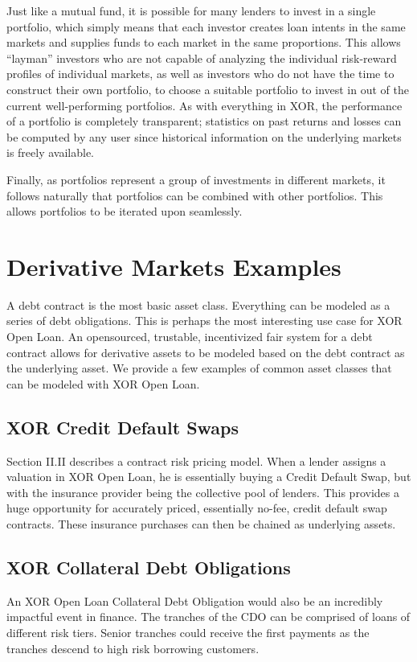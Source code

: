 \documentclass[twoside]{article}
\begin{document}
Just like a mutual fund, it is possible for many lenders to invest in a single portfolio, which simply means that each investor creates loan intents in the same markets and supplies funds to each market in the same proportions. This allows “layman” investors who are not capable of analyzing the individual risk-reward profiles of individual markets, as well as investors who do not have the time to construct their own portfolio, to choose a suitable portfolio to invest in out of the current well-performing portfolios. As with everything in XOR, the performance of a portfolio is completely transparent; statistics on past returns and losses can be computed by any user since historical information on the underlying markets is freely available.

Finally, as portfolios represent a group of investments in different markets, it follows naturally that portfolios can be combined with other portfolios. This allows portfolios to be iterated upon seamlessly.


\section{Derivative Markets Examples}
A debt contract is the most basic asset class. Everything can be modeled as a series of debt obligations. This is perhaps the most interesting use case for XOR Open Loan. An opensourced, trustable, incentivized fair system for a debt contract allows for derivative assets to be modeled based on the debt contract as the underlying asset. We provide a few examples of common asset classes that can be modeled with XOR Open Loan. 
\subsection{XOR Credit Default Swaps}
Section II.II describes a contract risk pricing model. When a lender assigns a valuation in XOR Open Loan, he is essentially buying a Credit Default Swap, but with the insurance provider being the collective pool of lenders. This provides a huge opportunity for accurately priced, essentially no-fee, credit default swap contracts. These insurance purchases can then be chained as underlying assets. 
\subsection{XOR Collateral Debt Obligations}
An XOR Open Loan Collateral Debt Obligation would also be an incredibly impactful event in finance. The tranches of the CDO can be comprised of loans of different risk tiers. Senior tranches could receive the first payments as the tranches descend to high risk borrowing customers. 
\end{document}
